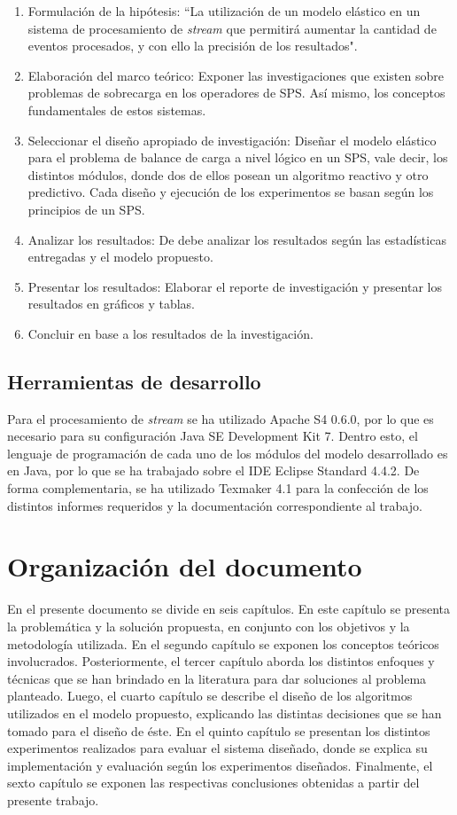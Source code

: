 \begin{enumerate}
	\item Formulación de la hipótesis: ``La utilización de un modelo elástico en un sistema de procesamiento de \textit{stream} que permitirá aumentar la cantidad de eventos procesados, y con ello la precisión de los resultados".
	\item Elaboración del marco teórico: Exponer las investigaciones que existen sobre problemas de sobrecarga en los operadores de SPS. Así mismo, los conceptos fundamentales de estos sistemas.
	\item Seleccionar el diseño apropiado de investigación: Diseñar el modelo elástico para el problema de balance de carga a nivel lógico en un SPS, vale decir, los distintos módulos, donde dos de ellos posean un algoritmo reactivo y otro predictivo. Cada diseño y ejecución de los experimentos se basan según los principios de un SPS.
	\item Analizar los resultados: De debe analizar los resultados según las estadísticas entregadas y el modelo propuesto.
	\item Presentar los resultados: Elaborar el reporte de investigación y presentar los resultados en gráficos y tablas.
	\item Concluir en base a los resultados de la investigación.
\end{enumerate}

\subsection{Herramientas de desarrollo}
Para el procesamiento de \textit{stream} se ha utilizado Apache S4 0.6.0, por lo que es necesario para su configuración Java SE Development Kit 7. Dentro esto, el lenguaje de programación de cada uno de los módulos del modelo desarrollado es en Java, por lo que se ha trabajado sobre el IDE Eclipse Standard 4.4.2. De forma complementaria, se ha utilizado Texmaker 4.1 para la confección de los distintos informes requeridos y la documentación correspondiente al trabajo.

\section{Organización del documento}
\label{intro:organizacion}
En el presente documento se divide en seis capítulos. En este capítulo se presenta la problemática y la solución propuesta, en conjunto con los objetivos y la metodología utilizada. En el segundo capítulo se exponen los conceptos teóricos involucrados. Posteriormente, el tercer capítulo aborda los distintos enfoques y técnicas que se han brindado en la literatura para dar soluciones al problema planteado. Luego, el cuarto capítulo se describe el diseño de los algoritmos utilizados en el modelo propuesto, explicando las distintas decisiones que se han tomado para el diseño de éste. En el quinto capítulo se presentan los distintos experimentos realizados para evaluar el sistema diseñado, donde se explica su implementación y evaluación según los experimentos diseñados. Finalmente, el sexto capítulo se exponen las respectivas conclusiones obtenidas a partir del presente trabajo.